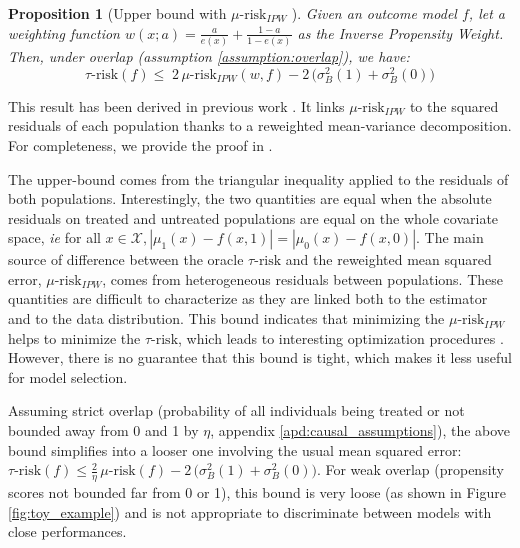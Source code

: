 \documentclass[10pt]{article}
\newtheorem{proposition}{Proposition}
\begin{document}
\begin{multicols}{2}
    \begin{proposition}[Upper bound with $\mu \text{-risk}_{IPW}$
        ]\label{theory:prop:mu_risk_ipw_bound}
        \cite{johansson_generalization_2021} Given an outcome model $f$, let a
        weighting function $w(x; a) = \frac{a}{e(x)} + \frac{1-a}{1-e(x)}$ as the
        Inverse Propensity Weight. Then, under overlap (assumption
        \ref{assumption:overlap}), we have:
        \begin{equation*}
            \tau\text{-risk}(f) \leq \; 2 \, \mu\text{-risk}_{IPW}(w, f)
            - 2 \, \big(\sigma^2_{B}(1) +  \sigma^2_{B}(0)\big)
        \end{equation*}
    \end{proposition}
    This result has been derived in previous work
    \cite{johansson_generalization_2021}. It links $\mu\text{-risk}_{IPW}$ to
    the squared residuals of each population thanks to a reweighted mean-variance
    decomposition. For completeness, we provide the proof in .

    The upper-bound comes from the triangular inequality applied to the residuals of
    both populations. Interestingly, the two quantities are equal when the
    absolute residuals on treated and untreated populations are equal on the
    whole covariate space, \emph{ie} for all
    $x \in \mathcal X, |\mu_1(x) - f(x, 1)| = |\mu_0(x) - f(x, 0)|$.
    The main source of difference between the oracle $\tau \text{-risk}$ and the
    reweighted mean squared error, $\mu\text{-risk}_{IPW}$, comes from heterogeneous
    residuals between populations. These quantities are difficult to characterize as
    they are linked both to the estimator and to the data distribution.
    This bound indicates that minimizing the $\mu\text{-risk}_{IPW}$ helps to
    minimize the $\tau\text{-risk}$, which leads to
    interesting optimization procedures \cite{johansson_generalization_2021}. However, there is no
    guarantee that this bound is tight, which makes it less useful for model
    selection.

    Assuming strict overlap (probability of all individuals being treated or not
    bounded away from 0 and 1 by $\eta$, appendix \ref{apd:causal_assumptions}), the
    above bound simplifies into a looser one involving the usual mean squared error:
    $\tau\text{-risk}(f)\leq \frac{2}{\eta}\, \mu\text{-risk}(f) -  2 \, \big(\sigma^2_{B}(1) +  \sigma^2_{B}(0)\big)$. For weak overlap (propensity scores not bounded far from 0
    or 1), this bound is very loose (as shown in Figure \ref{fig:toy_example})
    and is not appropriate to discriminate between models with close performances.


\end{multicols}
\end{document}
